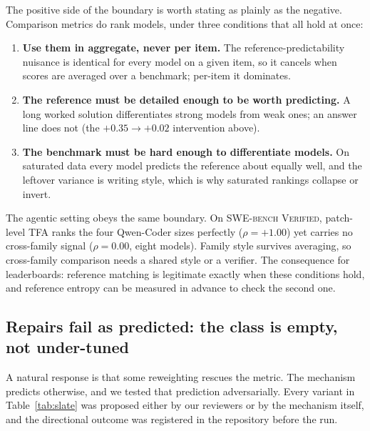 \documentclass[11pt]{article}
\newcommand{\tfa}{\textsc{TFA}}
\begin{document}
The positive side of the boundary is worth stating as plainly as the negative.
Comparison metrics do rank models, under three conditions that all hold at once:
\begin{enumerate}
\item \textbf{Use them in aggregate, never per item.}
The reference-predictability nuisance is identical for every model on a given item, so it cancels when scores are averaged over a benchmark; per-item it dominates.
\item \textbf{The reference must be detailed enough to be worth predicting.}
A long worked solution differentiates strong models from weak ones; an answer line does not (the $+0.35 \to +0.02$ intervention above).
\item \textbf{The benchmark must be hard enough to differentiate models.}
On saturated data every model predicts the reference about equally well, and the leftover variance is writing style, which is why saturated rankings collapse or invert.
\end{enumerate}
The agentic setting obeys the same boundary.
On \textsc{SWE-bench Verified}, patch-level \tfa{} ranks the four Qwen-Coder sizes perfectly ($\rho = +1.00$) yet carries no cross-family signal ($\rho = 0.00$, eight models).
Family style survives averaging, so cross-family comparison needs a shared style or a verifier.
The consequence for leaderboards: reference matching is legitimate exactly when these conditions hold, and reference entropy can be measured in advance to check the second one.

\subsection{Repairs fail as predicted: the class is empty, not under-tuned}
\label{sec:slate}

A natural response is that some reweighting rescues the metric.
The mechanism predicts otherwise, and we tested that prediction adversarially.
Every variant in Table~\ref{tab:slate} was proposed either by our reviewers or by the mechanism itself, and the directional outcome was registered in the repository before the run.
\end{document}
